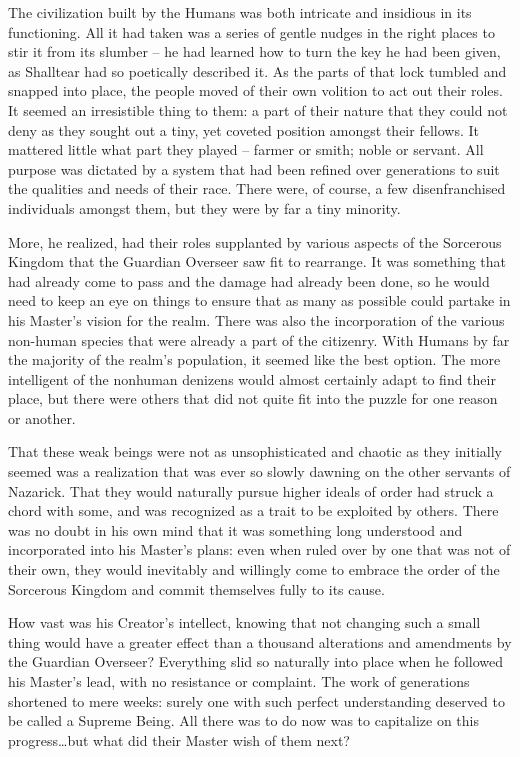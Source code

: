  

The civilization built by the Humans was both intricate and insidious in its functioning. All it had taken was a series of gentle nudges in the right places to stir it from its slumber – he had learned how to turn the key he had been given, as Shalltear had so poetically described it. As the parts of that lock tumbled and snapped into place, the people moved of their own volition to act out their roles. It seemed an irresistible thing to them: a part of their nature that they could not deny as they sought out a tiny, yet coveted position amongst their fellows. It mattered little what part they played – farmer or smith; noble or servant. All purpose was dictated by a system that had been refined over generations to suit the qualities and needs of their race. There were, of course, a few disenfranchised individuals amongst them, but they were by far a tiny minority.

 

More, he realized, had their roles supplanted by various aspects of the Sorcerous Kingdom that the Guardian Overseer saw fit to rearrange. It was something that had already come to pass and the damage had already been done, so he would need to keep an eye on things to ensure that as many as possible could partake in his Master’s vision for the realm. There was also the incorporation of the various non-human species that were already a part of the citizenry. With Humans by far the majority of the realm’s population, it seemed like the best option. The more intelligent of the nonhuman denizens would almost certainly adapt to find their place, but there were others that did not quite fit into the puzzle for one reason or another.

 

That these weak beings were not as unsophisticated and chaotic as they initially seemed was a realization that was ever so slowly dawning on the other servants of Nazarick. That they would naturally pursue higher ideals of order had struck a chord with some, and was recognized as a trait to be exploited by others. There was no doubt in his own mind that it was something long understood and incorporated into his Master’s plans: even when ruled over by one that was not of their own, they would inevitably and willingly come to embrace the order of the Sorcerous Kingdom and commit themselves fully to its cause.

 

How vast was his Creator’s intellect, knowing that not changing such a small thing would have a greater effect than a thousand alterations and amendments by the Guardian Overseer? Everything slid so naturally into place when he followed his Master’s lead, with no resistance or complaint. The work of generations shortened to mere weeks: surely one with such perfect understanding deserved to be called a Supreme Being. All there was to do now was to capitalize on this progress…but what did their Master wish of them next?

